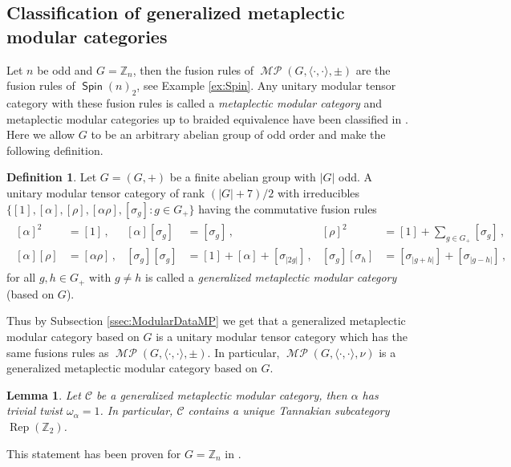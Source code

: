 \documentclass[twoside,11pt,reqno]{amsart}
\newtheorem{lem}[thm]{Lemma}
\theoremstyle{definition}
\newtheorem{defi}[thm]{Definition}
\theoremstyle{remark}
\newcommand{\Spin}{\mathop{\mathsf{Spin}}}
\newcommand{\cC}{\mathcal{C}}
\newcommand{\ZZ}{\mathbb{Z}}
\DeclareMathOperator{\Rep}{Rep}
\DeclareMathOperator*{\MP}{\mathcal{MP}}
\newcommand{\bi}[2]{\langle #1,#2\rangle}
\newcommand{\bislotslot}{\bi\cdot\cdot}
\newcommand{\myemph}[1]{\emph{#1}}
\begin{document}
\subsection{Classification of generalized metaplectic modular categories}
Let $n$ be odd and $G=\ZZ_n$, then the fusion rules of $\MP(G,\bislotslot,\pm)$
are the fusion rules of $\Spin(n)_2$, see Example \ref{ex:Spin}. 
Any unitary modular tensor category with these fusion rules %
is called a \myemph{metaplectic modular category} and 
metaplectic modular categories up to braided equivalence have been classified
in \cite{ArChRoWa2016}.
Here we allow $G$ to be an arbitrary abelian group of odd order and make the 
following definition.
\begin{defi} 
  \label{defi:GeneralizedMetaplecticModularCategory}
  Let $G=(G,+)$ be a finite abelian group with $|G|$ odd.
  A unitary modular tensor category of rank $(|G|+7)/2$ with irreducibles 
  $\{[1],[\alpha],[\rho],[\alpha\rho],[\sigma_g] : g\in G_+\}$ having the 
  commutative fusion rules
  \begin{gather}
    \label{eq:genMPFusionRules}
    \begin{aligned}
      [\alpha]^2&=[1]\,,
      &
      [\alpha][\sigma_g]&=[\sigma_g]\,,
      &
      [\rho]^2&=[1]+\sum_{g\in G_+}[\sigma_g]\,,
      \\
      [\alpha][\rho]&=[\alpha\rho]\,,
      &
      [\sigma_g][\sigma_{g}]&= [1]+[\alpha]+[\sigma_{|2g|}]\,, %
      &
      [\sigma_g][\sigma_h] &=[\sigma_{|g+h|}]+[\sigma_{|g-h|}]\,,
    \end{aligned}
  \end{gather}
  for all $g,h\in G_+$ with $g\neq h$ is called a 
  \myemph{generalized metaplectic modular category} (based on $G$).
\end{defi}
Thus by Subsection \ref{ssec:ModularDataMP} we get that 
a generalized metaplectic modular category based on $G$
is a unitary modular tensor category which has the same fusions rules as  
$\MP(G,\bislotslot,\pm)$.
In particular, $\MP(G,\bislotslot,\nu)$ 
is a generalized metaplectic modular category based on $G$.
\begin{lem}
  \label{lem:TrivialTwist}
  Let $\cC$ be a generalized metaplectic modular category, then $\alpha$ has 
  trivial twist $\omega_\alpha=1$. 
  In particular, $\cC$ contains a unique Tannakian subcategory
  $\Rep(\ZZ_2)$.
\end{lem}
This statement has been proven for $G=\ZZ_n$ in \cite{ArChRoWa2016}.
\end{document}
